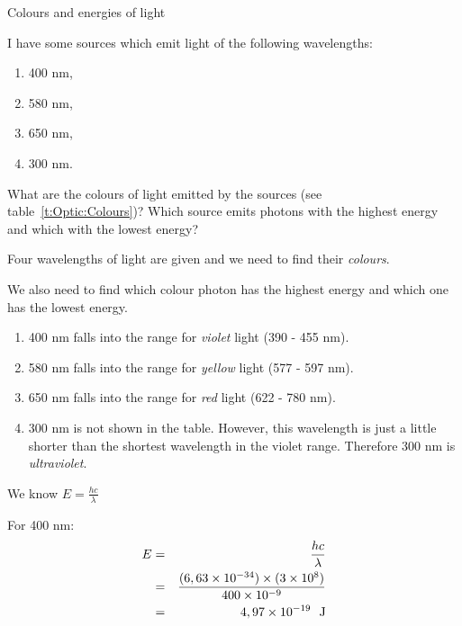 \begin{wex}{Colours and energies of light}
{I have some sources which emit light of the following wavelengths:
\begin{enumerate} 
\item 400 nm, 
\item 580 nm, 
\item 650 nm,
\item 300 nm.
\end{enumerate}
What are the colours of light emitted by the sources (see table~\ref{t:Optic:Colours})? Which source emits photons with the highest energy and which with the lowest energy?
}
{
Four wavelengths of light are given and we need to find their \textit{colours}. 

We also need to find which colour photon has the highest energy and which one has the lowest energy.

\begin{enumerate}
 \item 400 nm falls into the range for \textit{violet} light (390 - 455 nm).
 \item 580 nm falls into the range for \textit{yellow} light (577 - 597 nm).
 \item 650 nm falls into the range for \textit{red} light (622 - 780 nm).
 \item 300 nm is not shown in the table. However, this wavelength is just a little shorter than the shortest wavelength in the violet range. Therefore 300 nm is \textit{ultraviolet}.
\end{enumerate}


We know $E = \frac{hc}{\lambda}$

\begin{minipage}{0.3\textwidth}
For 400 nm:
\begin{eqnarray*}
E & = & \frac{hc}{\lambda} \\
  & = & \frac{(6,63 \times 10^{-34}) \times (3 \times 10^{8}) }{400 \times 10^{-9}} \\
  & = &  4,97 \times 10^{-19}~~\rm{J}
\end{eqnarray*}
\end{minipage}

}
\end{wex}
